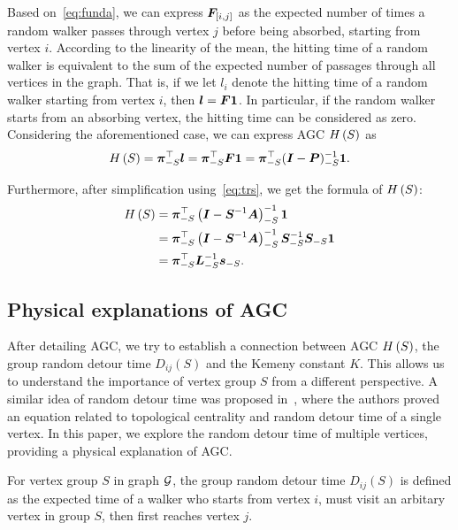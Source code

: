 \documentclass[journal]{IEEEtran}
\begin{document}
Based on~\eqref{eq:funda}, we can express \(\boldsymbol{F}_{[i,j]}\) as the expected number of times a random walker passes through vertex \(j\) before being absorbed, starting from vertex \(i\).
According to the linearity of the mean, the hitting time of a random walker is equivalent to the sum of the expected number of passages through all vertices in the graph. That is, if we let \(l_i\) denote the hitting time of a random walker starting from vertex \(i\), then \(\boldsymbol{l}=\boldsymbol{F}\boldsymbol{1}\).
In particular, if the random walker starts from an absorbing vertex, the hitting time can be considered as zero.
Considering the aforementioned case, we can express AGC \(H\left(S\right)\) as
\begin{equation*}
    H\left(S\right)=\boldsymbol{\pi}_{-S}^\top\boldsymbol{l}=\boldsymbol{\pi}_{-S}^\top\boldsymbol{F}\boldsymbol{1}=\boldsymbol{\pi}_{-S}^\top(\boldsymbol{I}-\boldsymbol{P})_{-S}^{-1}\boldsymbol{1}.
\end{equation*}

Furthermore, after simplification using~\eqref{eq:trs}, we get the formula of \(H\left(S\right)\):
\begin{equation}\label{eq:AGC}
    \begin{split}
        H\left(S\right) & =\boldsymbol{\pi}_{-S}^\top\left( \boldsymbol{I}-\boldsymbol{S}^{-1}\boldsymbol{A} \right)_{-S}^{-1}\boldsymbol{1}                          \\
        & =\boldsymbol{\pi}_{-S}^\top\left( \boldsymbol{I}-\boldsymbol{S}^{-1}\boldsymbol{A} \right)_{-S}^{-1}\boldsymbol{S}_{-S}^{-1}\boldsymbol{S}_{-S}\boldsymbol{1} \\
        & =\boldsymbol{\pi}_{-S}^\top\boldsymbol{L}_{-S}^{-1}\boldsymbol{s}_{-S}.
    \end{split}
\end{equation}

\subsection{Physical explanations of AGC}

After detailing AGC, we try to establish a connection between AGC \(H\left(S\right)\), the group random detour time \(D_{ij}(S)\) and the Kemeny constant \(K\).
This allows us to understand the importance of vertex group \(S\) from a different perspective.
A similar idea of random detour time was proposed in~\cite{RaZh13}, where the authors proved an equation related to topological centrality and random detour time of a single vertex.
In this paper, we explore the random detour time of multiple vertices, providing a physical explanation of AGC.

For vertex group \(S\) in graph \(\mathcal{G}\), the group random detour time \(D_{ij}(S)\) is defined as the expected time of a walker who starts from vertex \(i\), must visit an arbitary vertex in group \(S\), then first reaches vertex \(j\).
\end{document}

